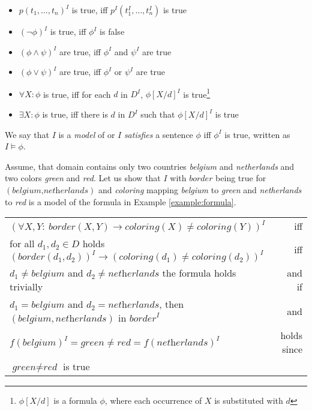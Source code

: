 \begin{itemize}
  \item $p(t_1,\dots,t_n)^I$ is true, iff $p^I(t_1^I,\dots,t_n^I)$ is true
  \item $(\lnot \phi)^I$ is true, iff $\phi^I$ is false
  \item $(\phi \wedge \psi)^I$ are true, iff $\phi^I$ and $\psi^I$ are true
  \item $(\phi \vee \psi)^I$ are true, iff $\phi^I$ or $\psi^I$ are true
  \item $\forall X: \phi$ is true, iff for each $d$ in $D^I$, $\phi[X/d]^I$ is true\footnote{$\phi[X/d]$ is a formula $\phi$, where each occurrence of $X$ is substituted with $d$}
  \item $\exists X: \phi$ is true, iff there is $d$ in $D^I$ such that $\phi[X/d]^I$ is true
\end{itemize}

We say that $I$ is a \textit{model} of or $I$ \textit{satisfies} a sentence $\phi$ iff $\phi^I$ is true, written as $I \models \phi$.

\begin{example}
  Assume, that domain contains only two countries \textit{belgium} and \textit{netherlands} and two colors \textit{green} and \textit{red}. Let us show that $I$ with $\textit{border}$ being true for $(\textit{belgium,netherlands})$ and \textit{coloring} mapping \textit{belgium} to \textit{green} and \textit{netherlands} to \textit{red} is a model of the formula in Example \ref{example:formula}.

  \begin{tabular}{l r}
$(\forall X,Y{:}~\textit{border}(X,Y) \rightarrow \textit{coloring}(X) \neq \textit{coloring}(Y))^I$  & iff \\
for all $d_1,d_2 \in D$ holds $(\textit{border}(d_1,d_2))^I \rightarrow (\textit{coloring}(d_1) \neq \textit{coloring}(d_2))^I$ & iff \\
$d_1 \neq \textit{belgium}$ and $d_2 \neq \textit{netherlands}$  the formula holds trivially & and if\\
$d_1  = \textit{belgium}$ and $d_2 = \textit{netherlands}$, then $(\textit{belgium}, \textit{netherlands})$ in $\textit{border}^I$ & and\\ 
$f(\textit{belgium})^I = \textit{green} \neq \textit{red} = f(\textit{netherlands})^I$ & holds since \\
$\textit{green} \neq \textit{red}$  is true &
  \end{tabular}
\end{example}


